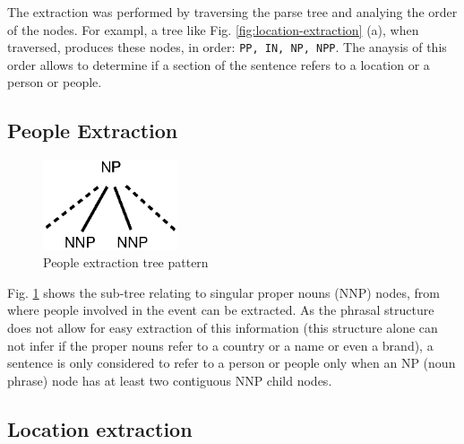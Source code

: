 \documentclass{llncs}
\begin{document}
The extraction was performed by traversing the parse tree and analying the order of the nodes. For exampl, a tree like Fig. \ref{fig:location-extraction} (a), when traversed, produces these nodes, in order: \verb!PP, IN, NP, NPP!. The anaysis of this order allows to determine if a section of the sentence refers to a location or a person or people.

\subsection{People Extraction}
\label{subsec:approach:people-extraction}

\begin{figure}[h]
	\centering
	\includegraphics[width=40mm]{dia/people.eps}
	\caption{People extraction tree pattern}
	\label{fig:people-extraction}
\end{figure}

Fig. \ref{fig:people-extraction} shows the sub-tree relating to singular proper nouns (NNP) nodes, from where people involved in the event can be extracted. As the phrasal structure does not allow for easy extraction of this information (this structure alone can not infer if the proper nouns refer to a country or a name or even a brand), a sentence is only considered to refer to a person or people only when an NP (noun phrase) node has at least two contiguous NNP child nodes.

\subsection{Location extraction}
\label{subsec:approach:local-extraction}
\end{document}
